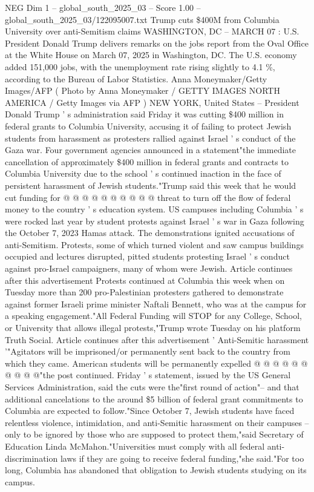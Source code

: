 \begin{textsample}{NEG Dim 1 – global\_south\_2025\_03 – Score 1.00 – global\_south\_2025\_03/122095007.txt}  \label{ex:f1_neg_183}
Trump cuts \$400M from Columbia University over anti-Semitism claims WASHINGTON, DC -- MARCH 07 : U.S.
President Donald Trump delivers remarks on the jobs report from the Oval Office at the White House on March 07, 2025 in Washington, DC.
The U.S. economy added 151,000 jobs, with the unemployment rate rising slightly to 4.1 \%, according to the Bureau of Labor Statistics.
Anna Moneymaker/Getty Images/AFP ( Photo by Anna Moneymaker / GETTY IMAGES NORTH AMERICA / Getty Images via AFP ) NEW YORK, United States -- President Donald Trump ' s administration said Friday it was cutting \$400 million in federal grants to Columbia University, accusing it of failing to protect Jewish students from harassment as protesters rallied against Israel ' s conduct of the Gaza war.
Four government agencies announced in a statement"the immediate cancellation of approximately \$400 million in federal grants and contracts to Columbia University due to the school ' s continued inaction in the face of persistent harassment of Jewish students."Trump said this week that he would cut funding for @ @ @ @ @ @ @ @ @ @ threat to turn off the flow of federal money to the country ' s education system.
US campuses including Columbia ' s were rocked last year by student protests against Israel ' s war in Gaza following the October 7, 2023 Hamas attack.
The demonstrations ignited accusations of anti-Semitism.
Protests, some of which turned violent and saw campus buildings occupied and lectures disrupted, pitted students protesting Israel ' s conduct against pro-Israel campaigners, many of whom were Jewish.
Article continues after this advertisement Protests continued at Columbia this week when on Tuesday more than 200 pro-Palestinian protesters gathered to demonstrate against former Israeli prime minister Naftali Bennett, who was at the campus for a speaking engagement."All Federal Funding will STOP for any College, School, or University that allows illegal protests,"Trump wrote Tuesday on his platform Truth Social.
Article continues after this advertisement ' Anti-Semitic harassment '"Agitators will be imprisoned/or permanently sent back to the country from which they came.
American students will be permanently expelled @ @ @ @ @ @ @ @ @ @"the post continued.
Friday ' s statement, issued by the US General Services Administration, said the cuts were the"first round of action"-- and that additional cancelations to the around \$5 billion of federal grant commitments to Columbia are expected to follow."Since October 7, Jewish students have faced relentless violence, intimidation, and anti-Semitic harassment on their campuses -- only to be ignored by those who are supposed to protect them,"said Secretary of Education Linda McMahon."Universities must comply with all federal anti-discrimination laws if they are going to receive federal funding,"she said."For too long, Columbia has abandoned that obligation to Jewish students studying on its campus.

\end{textsample}
